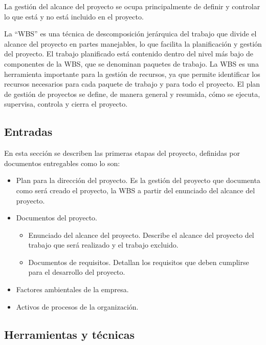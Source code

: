 \documentclass[letterpaper,12pt,openright,oneside]{article}
\theoremstyle{plain}
\begin{document}
La gestión del alcance del proyecto se ocupa principalmente de
definir y controlar lo que está y no está incluido en el proyecto.


La ``WBS'' es una técnica de descomposición jerárquica del trabajo que divide el alcance del proyecto en partes manejables, lo que facilita la planificación y gestión del proyecto. 
El trabajo planificado está contenido dentro del nivel más bajo de componentes de la WBS, que se denominan paquetes de trabajo. 
La WBS es una herramienta importante para la gestión de recursos, ya que permite identificar los recursos necesarios para cada paquete de trabajo y para todo el proyecto. 
El plan de gestión de proyectos se define, de manera general y resumida, cómo se ejecuta, supervisa, controla y cierra el proyecto.
% 
% 
\subsection*{Entradas}

En esta sección se describen las primeras etapas del proyecto, definidas por documentos entregables como lo son:

\begin{itemize}
    \item Plan para la dirección del proyecto. Es la gestión del proyecto que documenta como será creado el proyecto, la WBS a partir del enunciado del alcance del proyecto.
    \item Documentos del proyecto.
        \begin{itemize}
            \item Enunciado del alcance del proyecto. Describe el alcance del proyecto del trabajo que será realizado y el trabajo excluido.
            \item Documentos de requisitos. Detallan los requisitos que deben cumplirse para el desarrollo del proyecto.
        \end{itemize}
    \item Factores ambientales de la empresa.
    \item Activos de procesos de la organización.
    
\end{itemize}
% 
% 
\subsection*{Herramientas y técnicas}
\end{document}
